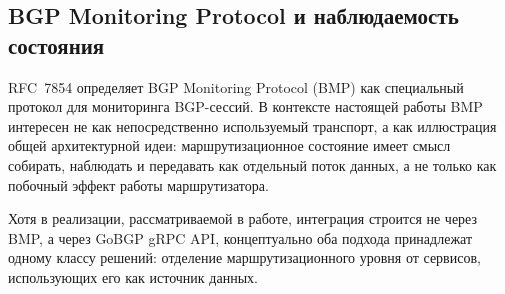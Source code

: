 \subsection{BGP Monitoring Protocol и наблюдаемость состояния}

RFC~7854 \cite{rfc7854} определяет BGP Monitoring Protocol (BMP) как
специальный протокол для мониторинга BGP-сессий. В контексте настоящей
работы BMP интересен не как непосредственно используемый транспорт, а
как иллюстрация общей архитектурной идеи: маршрутизационное состояние
имеет смысл собирать, наблюдать и передавать как отдельный поток
данных, а не только как побочный эффект работы маршрутизатора.

Хотя в реализации, рассматриваемой в работе, интеграция строится не
через BMP, а через GoBGP gRPC API, концептуально оба подхода
принадлежат одному классу решений: отделение маршрутизационного уровня
от сервисов, использующих его как источник данных.

